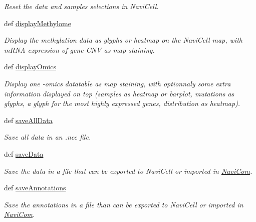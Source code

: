 \begin{DoxyCompactItemize}
\begin{DoxyCompactList}\small\item\em Reset the data and samples selections in NaviCell. \item\end{DoxyCompactList}\item 
def \hyperlink{classnavicom_1_1navicom_1_1NaviCom_a018f936de625af8a5dd7e8250ede6483}{displayMethylome}
\begin{DoxyCompactList}\small\item\em Display the methylation data as glyphs or heatmap on the NaviCell map, with mRNA expression of gene CNV as map staining. \item\end{DoxyCompactList}\item 
def \hyperlink{classnavicom_1_1navicom_1_1NaviCom_a01066363389ca01c24f683956f3dc9ad}{displayOmics}
\begin{DoxyCompactList}\small\item\em Display one -\/omics datatable as map staining, with optionnaly some extra information displayed on top (samples as heatmap or barplot, mutations as glyphs, a glyph for the most highly expressed genes, distribution as heatmap). \item\end{DoxyCompactList}\item 
def \hyperlink{classnavicom_1_1navicom_1_1NaviCom_ab539e16bff0a424ebd2753c153ff4e53}{saveAllData}
\begin{DoxyCompactList}\small\item\em Save all data in an .ncc file. \item\end{DoxyCompactList}\item 
\hypertarget{classnavicom_1_1navicom_1_1NaviCom_ac53d9dc53ca0af44586a55fb1bffe8bd}{
def \hyperlink{classnavicom_1_1navicom_1_1NaviCom_ac53d9dc53ca0af44586a55fb1bffe8bd}{saveData}}
\label{classnavicom_1_1navicom_1_1NaviCom_ac53d9dc53ca0af44586a55fb1bffe8bd}

\begin{DoxyCompactList}\small\item\em Save the data in a file that can be exported to NaviCell or imported in \hyperlink{classnavicom_1_1navicom_1_1NaviCom}{NaviCom}. \item\end{DoxyCompactList}\item 
\hypertarget{classnavicom_1_1navicom_1_1NaviCom_aa6a527c98c20f4f75b8529fca178dddc}{
def \hyperlink{classnavicom_1_1navicom_1_1NaviCom_aa6a527c98c20f4f75b8529fca178dddc}{saveAnnotations}}
\label{classnavicom_1_1navicom_1_1NaviCom_aa6a527c98c20f4f75b8529fca178dddc}

\begin{DoxyCompactList}\small\item\em Save the annotations in a file than can be exported to NaviCell or imported in \hyperlink{classnavicom_1_1navicom_1_1NaviCom}{NaviCom}. \item\end{DoxyCompactList}\end{DoxyCompactItemize}
